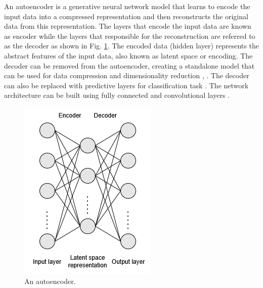 \documentclass[preprint,12pt]{elsarticle}
\begin{document}
An autoencoder is a generative neural network model that learns to encode the input data into a compressed representation and then reconstructs the original data from this representation. The layers that encode the input data are known as encoder while the layers that responsible for the reconstruction are referred to as the decoder as shown in Fig. \ref{fig_deep_unsv_learning_ae}. The encoded data (hidden layer) represents the abstract features of the input data, also known as latent space or encoding. The decoder can be removed from the autoencoder, creating a standalone model that can be used for data compression and dimensionality reduction \citep{romero_quantum_2017}, \citep{li_guided_2020}. The decoder can also be replaced with predictive layers for classification task \citep{mohd_noor_feature_2021}. The network architecture can be built using fully connected and convolutional layers \citep{li_comprehensive_2023}. 

\begin{figure}[h!]
    \centering
    \includegraphics[scale=0.6]{fig_deep_unsv_learning_ae.png}
    \caption{An autoencoder.}
    \label{fig_deep_unsv_learning_ae}
\end{figure}
\end{document}
